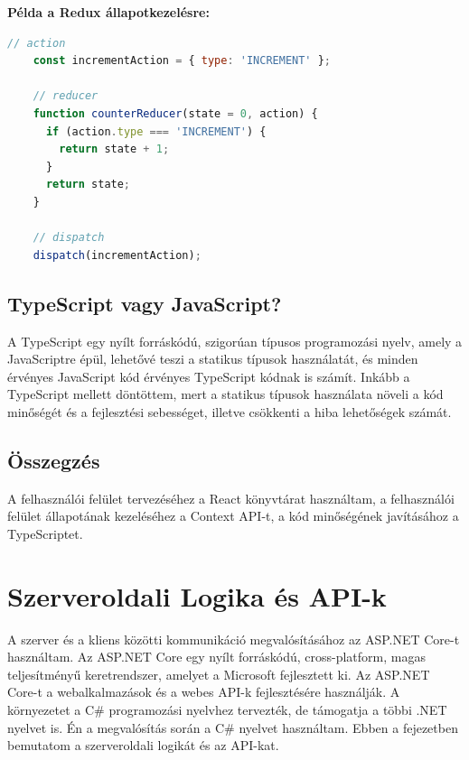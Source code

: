 \textbf{Példa a Redux állapotkezelésre:}
\begin{lstlisting}[language=JavaScript]
    // action
    const incrementAction = { type: 'INCREMENT' };
    
    // reducer
    function counterReducer(state = 0, action) {
      if (action.type === 'INCREMENT') {
        return state + 1;
      }
      return state;
    }
    
    // dispatch
    dispatch(incrementAction);
\end{lstlisting}

\subsection*{TypeScript vagy JavaScript?}
A TypeScript egy nyílt forráskódú, szigorúan típusos programozási nyelv,
amely a JavaScriptre épül, lehetővé teszi a statikus típusok használatát,
és minden érvényes JavaScript kód érvényes TypeScript kódnak is számít.
Inkább a TypeScript mellett döntöttem, mert a statikus típusok használata
növeli a kód minőségét és a fejlesztési sebességet, illetve csökkenti a hiba lehetőségek számát.

\subsection*{Összegzés}
A felhasználói felület tervezéséhez a React könyvtárat használtam,
a felhasználói felület állapotának kezeléséhez a Context API-t,
a kód minőségének javításához a TypeScriptet.

\section{Szerveroldali Logika és API-k}
A szerver és a kliens közötti kommunikáció megvalósításához az ASP.NET Core-t használtam.
Az ASP.NET Core egy nyílt forráskódú, cross-platform, magas teljesítményű keretrendszer,
amelyet a Microsoft fejlesztett ki.
Az ASP.NET Core-t a webalkalmazások és a webes API-k fejlesztésére használják.
A környezetet a C\# programozási nyelvhez tervezték, de támogatja a többi .NET nyelvet is.
Én a megvalósítás során a C\# nyelvet használtam.
Ebben a fejezetben bemutatom a szerveroldali logikát és az API-kat.

